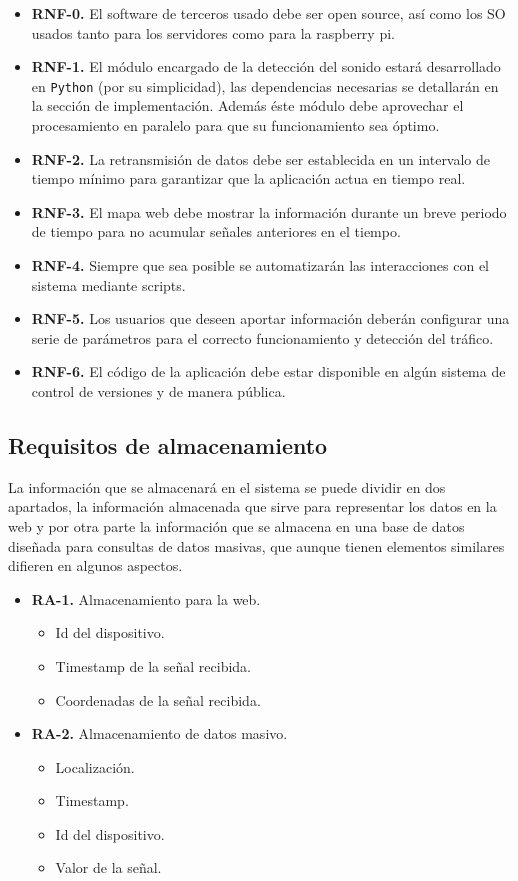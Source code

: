 \begin{itemize}
  \item \textbf{RNF-0.} El software de terceros usado debe ser open source, así como los SO usados tanto para los servidores como para la raspberry pi.
  \item \textbf{RNF-1.} El módulo encargado de la detección del sonido estará desarrollado en {\tt Python} (por su simplicidad), las dependencias necesarias se detallarán en la sección de implementación. Además éste módulo debe aprovechar el procesamiento en paralelo para que su funcionamiento sea óptimo.
  \item \textbf{RNF-2.} La retransmisión de datos debe ser establecida en un intervalo de tiempo mínimo para garantizar que la aplicación actua en tiempo real.
  \item \textbf{RNF-3.} El mapa web debe mostrar la información durante un breve periodo de tiempo para no acumular señales anteriores en el tiempo.
  \item \textbf{RNF-4.} Siempre que sea posible se automatizarán las interacciones con el sistema mediante scripts.
  \item \textbf{RNF-5.} Los usuarios que deseen aportar información deberán configurar una serie de parámetros para el correcto funcionamiento y detección del tráfico.
  \item \textbf{RNF-6.} El código de la aplicación debe estar disponible en algún sistema de control de versiones y de manera pública.
\end{itemize}

\subsection{Requisitos de almacenamiento}

La información que se almacenará en el sistema se puede dividir en dos apartados, la información almacenada que sirve para representar los datos en la web y por otra parte la información que se almacena en una base de datos diseñada para consultas de datos masivas, que aunque tienen elementos similares difieren en algunos aspectos.

\begin{itemize}
  \item \textbf{RA-1.} Almacenamiento para la web.
  \begin{itemize}
    \item Id del dispositivo.
    \item Timestamp de la señal recibida.
    \item Coordenadas de la señal recibida.
  \end{itemize}
  \item \textbf{RA-2.} Almacenamiento de datos masivo.
  \begin{itemize}
    \item Localización.
    \item Timestamp.
    \item Id del dispositivo.
    \item Valor de la señal.
  \end{itemize}
\end{itemize}

